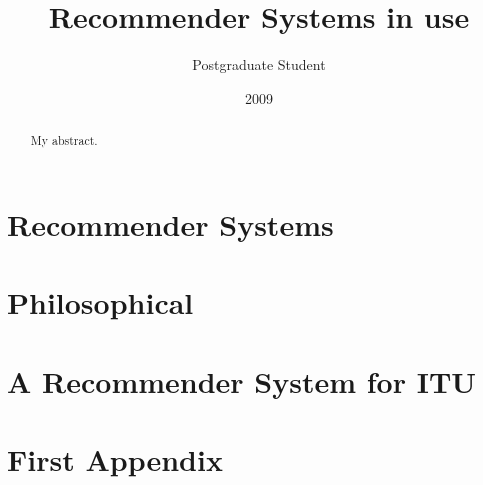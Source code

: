 \documentclass[10pt, oneside]{report}
\title{Recommender Systems in use}
\author{Postgraduate Student}
\date{2009}
\begin{document}
\newcommand\todo[1]{\textcolor{red}{#1}\PackageWarning{TODO:}{#1!}}

\maketitle

\declaration

\dedication{To my ...}

\begin{abstract}
My abstract.
\end{abstract}

\tableofcontents

\chapter{Recommender Systems}
\label{chap:chapter1}




\chapter{Philosophical}
\label{chap:chapter2}



\chapter{A Recommender System for ITU}
\label{chap:chapter3}







\chapter{First Appendix}

\end{document}
